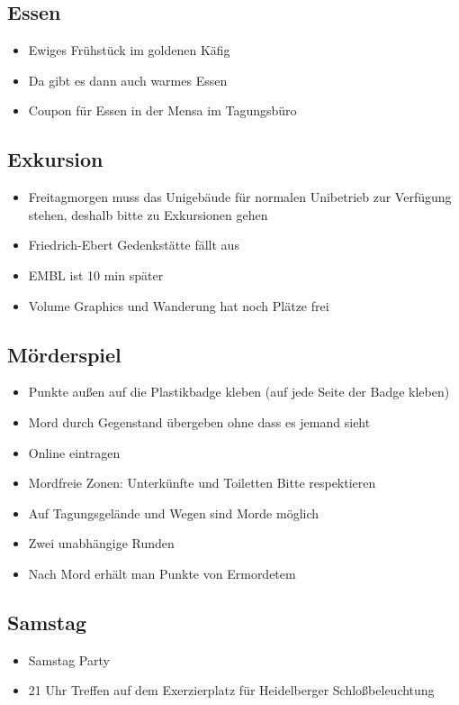   \subsection{Essen}
    \begin{itemize}
      \item Ewiges Frühstück im goldenen Käfig
      \item Da gibt es dann auch warmes Essen
      \item Coupon für Essen in der Mensa im Tagungsbüro
    \end{itemize}

  \subsection{Exkursion}
    \begin{itemize}
    \item Freitagmorgen muss das Unigebäude für normalen Unibetrieb zur Verfügung stehen, deshalb bitte zu Exkursionen gehen
    \item Friedrich-Ebert Gedenkstätte fällt aus
    \item EMBL ist 10 min später
    \item Volume Graphics und Wanderung hat noch Plätze frei
    \end{itemize}

  \subsection{Mörderspiel}
    \begin{itemize}
      \item Punkte außen auf die Plastikbadge kleben (auf jede Seite der Badge kleben)
      \item Mord durch Gegenstand übergeben ohne dass es jemand sieht
      \item Online eintragen
      \item Mordfreie Zonen: Unterkünfte und Toiletten Bitte respektieren
      \item Auf Tagungsgelände und Wegen sind Morde möglich
      \item Zwei unabhängige Runden
      \item Nach Mord erhält man Punkte von Ermordetem
    \end{itemize}

  \subsection{Samstag}
    \begin{itemize}
      \item Samstag Party
      \item 21 Uhr Treffen auf dem Exerzierplatz für Heidelberger Schloßbeleuchtung
    \end{itemize}

